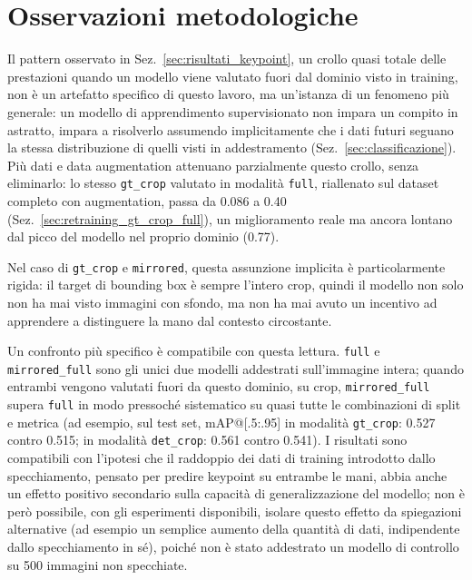 \section{Osservazioni metodologiche}

Il pattern osservato in Sez.~\ref{sec:risultati_keypoint}, un crollo
quasi totale delle prestazioni quando un modello viene valutato fuori
dal dominio visto in training, non è un artefatto specifico di questo
lavoro, ma un'istanza di un fenomeno più generale: un modello di
apprendimento supervisionato non impara un compito in astratto, impara
a risolverlo assumendo implicitamente che i dati futuri seguano la
stessa distribuzione di quelli visti in addestramento
(Sez.~\ref{sec:classificazione}). Più dati e data augmentation
attenuano parzialmente questo crollo, senza eliminarlo: lo stesso
\texttt{gt\_crop} valutato in modalità \texttt{full}, riallenato sul
dataset completo con augmentation, passa da 0.086 a 0.40
(Sez.~\ref{sec:retraining_gt_crop_full}), un miglioramento reale ma
ancora lontano dal picco del modello nel proprio dominio (0.77).

Nel caso di \texttt{gt\_crop} e
\texttt{mirrored}, questa assunzione implicita è particolarmente
rigida: il target di bounding box è sempre l'intero crop, quindi il
modello non solo non ha mai visto immagini con sfondo, ma non ha mai
avuto un incentivo ad apprendere a distinguere la mano dal contesto
circostante.

Un confronto più specifico è compatibile con questa lettura.
\texttt{full} e \texttt{mirrored\_full} sono gli unici due modelli
addestrati sull'immagine intera; quando entrambi vengono valutati fuori
da questo dominio, su crop, \texttt{mirrored\_full} supera \texttt{full}
in modo pressoché sistematico su quasi tutte le combinazioni di split e
metrica (ad esempio, sul test set, mAP@[.5:.95] in modalità
\texttt{gt\_crop}: 0.527 contro 0.515; in modalità \texttt{det\_crop}:
0.561 contro 0.541). I risultati sono compatibili con l'ipotesi che il
raddoppio dei dati di training introdotto dallo specchiamento, pensato
per predire keypoint su entrambe le mani, abbia anche un effetto
positivo secondario sulla capacità di generalizzazione del modello; non
è però possibile, con gli esperimenti disponibili, isolare questo
effetto da spiegazioni alternative (ad esempio un semplice aumento
della quantità di dati, indipendente dallo specchiamento in sé), poiché
non è stato addestrato un modello di controllo su 500 immagini non
specchiate.

